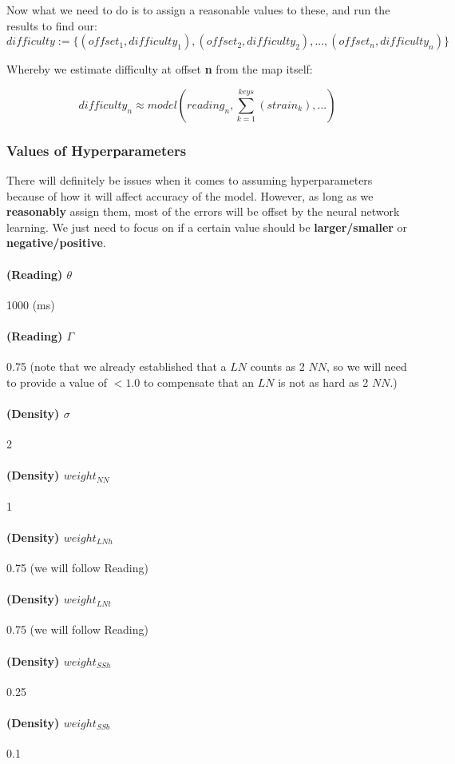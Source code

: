 Now what we need to do is to assign a reasonable values to these, and run the results to find our:
$$ difficulty := \lbrace(offset_1, difficulty_1), (offset_2, difficulty_2), ..., (offset_n, difficulty_n)\rbrace $$

Whereby we estimate difficulty at offset \textbf{n} from the map itself:

$$ difficulty_n \approx model \left( reading_n, \sum_{k=1}^{keys} \left(strain_k \right), ... \right)$$

\subsubsection{Values of Hyperparameters}

There will definitely be issues when it comes to assuming hyperparameters because of how it will affect accuracy of the model. However, as long as we \textbf{reasonably} assign them, most of the errors will be offset by the neural network learning. We just need to focus on if a certain value should be \textbf{larger/smaller} or \textbf{negative/positive}.

\paragraph{(Reading) $\theta$} 1000 (ms)
\paragraph{(Reading) $\Gamma$} 0.75 (note that we already established that a $LN$ counts as 2 $NN$, so we will need to provide a value of $<1.0$ to compensate that an $LN$ is not as hard as 2 $NN$.)

\paragraph{(Density) $\sigma$} 2

\paragraph{(Density) $weight_{NN}$} 1
\paragraph{(Density) $weight_{LNh}$} 0.75 (we will follow Reading)
\paragraph{(Density) $weight_{LNt}$} 0.75 (we will follow Reading)
\paragraph{(Density) $weight_{SSh}$} 0.25
\paragraph{(Density) $weight_{SSb}$} 0.1


